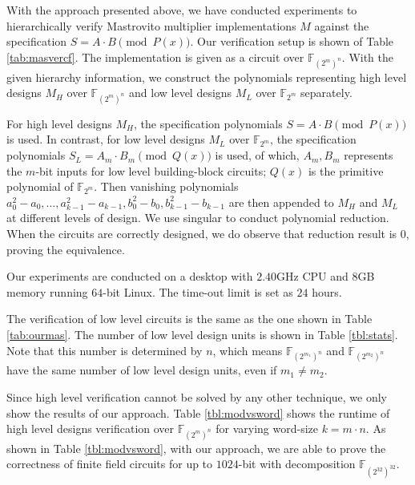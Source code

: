 With the approach presented above, we have conducted experiments to
hierarchically verify Mastrovito multiplier implementations $M$
against the specification $S = A\cdot B \pmod{ P(x)}$. Our
verification setup is shown of Table \ref{tab:masvercf}. The implementation
is given as a circuit over $\mathbb{F}_{(2^m)^n}$. With the given hierarchy
information, we construct the polynomials representing high level
designs $M_H$ over $\mathbb{F}_{(2^m)^n}$ and low level designs $M_L$
over $\mathbb{F}_{2^m}$ separately. 

For high level designs $M_H$, the specification polynomials $S = A \cdot B \pmod{ P(x)}$ is used.
In contrast, for low level designs $M_L$ over $\mathbb{F}_{2^m}$, the specification
polynomials $S_L  = A_{m} \cdot B_{m} \pmod{ Q(x)}$ is used, of which,
$A_{m},B_{m}$ represents the $m$-bit inputs for low level building-block circuits;
$Q(x)$ is the primitive polynomial of $\mathbb{F}_{2^m}$.
Then vanishing polynomials ${a_0^2-a_0,\dots,a_{k-1}^2-a_{k-1}, b_0^2-b_0,b_{k-1}^2-b_{k-1}}$ 
are then appended to $M_H$ and $M_L$ at different levels of design.
We use {\sc singular} \cite{DGPS} to conduct polynomial reduction. 
When the circuits are correctly designed, we do observe that reduction result is $0$, 
proving the equivalence. 

Our experiments are conducted on a desktop with $2.40$GHz CPU and $8$GB
memory running $64$-bit Linux. The time-out limit is set as $24$ hours. 

The verification of low level circuits is the same as the one shown in Table \ref{tab:ourmas}. 
The number of low level design units is shown in Table \ref{tbl:stats}. Note
that this number is determined by $n$, which means $\mathbb{F}_{(2^{m_1})^n}$
and $\mathbb{F}_{(2^{m_2})^n}$ have the same number of low level design units,
even if $m_1 \neq m_2$.

Since high level verification cannot be solved by any other technique, we only show the results of our approach.
Table \ref{tbl:modvsword} shows the runtime of high level designs verification over $\mathbb{F}_{(2^m)^n}$ 
for varying word-size $k=m\cdot n$. As shown in Table \ref{tbl:modvsword}, with our approach, 
we are able to prove the correctness of finite field circuits for up to $1024$-bit 
with decomposition $\mathbb{F}_{(2^{32})^{32}}$.

